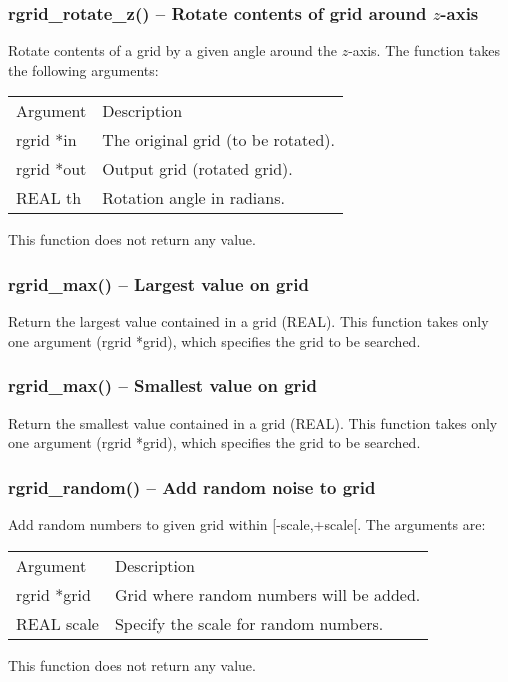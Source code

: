 \documentclass[12pt,letterpaper]{article}
\begin{document}
\subsubsection{rgrid\_rotate\_z() -- Rotate contents of grid around $z$-axis}

Rotate contents of a grid by a given angle around the $z$-axis. The function takes the following arguments:
\begin{longtable}{p{} p{}}
Argument & Description\\
\cline{1-2}
rgrid *in & The original grid (to be rotated).\\                                                                                
rgrid *out & Output grid (rotated grid).\\
REAL th & Rotation angle in radians.\\
\end{longtable}
\noindent
This function does not return any value. 

\subsubsection{rgrid\_max() -- Largest value on grid}

Return the largest value contained in a grid (REAL). This function takes only one argument (rgrid *grid), which specifies the grid to be searched.

\subsubsection{rgrid\_max() -- Smallest value on grid}

Return the smallest value contained in a grid (REAL). This function takes only one argument (rgrid *grid), which specifies the grid to be searched.

\subsubsection{rgrid\_random() -- Add random noise to grid}

Add random numbers to given grid within [-scale,+scale[. The arguments are:
\begin{longtable}{p{} p{}}
Argument & Description\\
\cline{1-2}
rgrid *grid & Grid where random numbers will be added.\\
REAL scale & Specify the scale for random numbers.\\
\end{longtable}
\noindent
This function does not return any value. 
\end{document}
